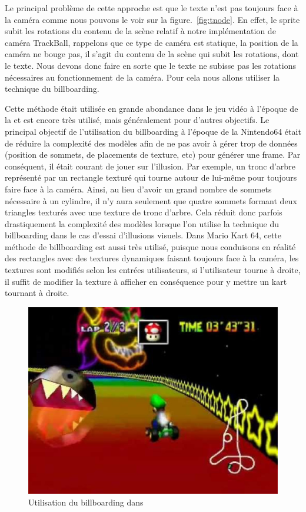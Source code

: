 \documentclass[a4paper, 11pt]{article}
\begin{document}
Le principal problème de cette approche est que le texte n'est pas toujours face à la caméra comme nous pouvons le voir sur la figure.~\ref{fig:tnode}. En effet, le sprite subit les rotations du contenu de la scène relatif à notre implémentation de caméra TrackBall, rappelons que ce type de caméra est statique, la position de la caméra ne bouge pas, il s'agit du contenu de la scène qui subit les rotations, dont le texte. Nous devons donc faire en sorte que le texte ne subisse pas les rotations nécessaires au fonctionnement de la caméra. Pour cela nous allons utiliser la technique du billboarding.

Cette méthode était utilisée en grande abondance dans le jeu vidéo à l'époque de la  et est encore très utilisé, mais généralement pour d'autres objectifs. Le principal objectif de l'utilisation du billboarding à l'époque de la Nintendo64 était de réduire la complexité des modèles afin de ne pas avoir à gérer trop de données (position de sommets, de placements de texture, etc) pour générer une frame. Par conséquent, il était courant de jouer sur l'illusion. Par exemple, un tronc d'arbre représenté par un rectangle texturé qui tourne autour de lui-même pour toujours faire face à la caméra. Ainsi, au lieu d'avoir un grand nombre de sommets nécessaire à un cylindre, il n'y aura seulement que quatre sommets formant deux triangles texturés avec une texture de tronc d'arbre. Cela réduit donc parfois drastiquement la complexité des modèles lorsque l'on utilise la technique du billboarding dans le cas d'essai d'illusions visuels. Dans Mario Kart 64, cette méthode de billboarding est aussi très utilisé, puisque nous conduisons en réalité des rectangles avec des textures dynamiques faisant toujours face à la caméra, les textures sont modifiés selon les entrées utilisateurs, si l'utilisateur tourne à droite, il suffit de modifier la texture à afficher en conséquence pour y mettre un kart tournant à droite.

\begin{figure}[ht]
  \begin{center}
    \includegraphics[scale=0.4]{contents/mk64}
  \end{center}
  \caption{Utilisation du billboarding dans }
  \label{fig:mk64}
\end{figure}
\end{document}
